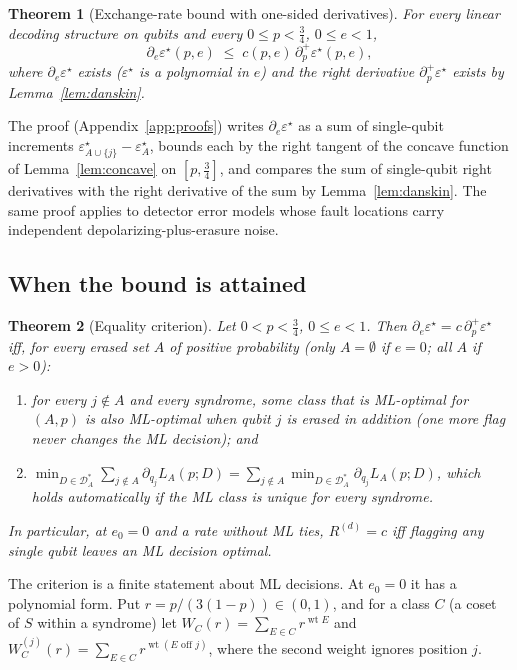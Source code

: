 \documentclass[11pt,a4paper]{article}
\theoremstyle{plain}
\newtheorem{theorem}{Theorem}[section]
\theoremstyle{definition}
\theoremstyle{remark}
\newcommand{\err}{\varepsilon^{\star}}
\newcommand{\wt}{\operatorname{wt}}
\begin{document}
\begin{theorem}[Exchange-rate bound with one-sided derivatives]\label{thm:rate-right}
For every linear decoding structure on qubits and every $0\le p<\tfrac34$, $0\le e<1$,
\[
\partial_e\err(p,e)\;\le\;c(p,e)\,\partial_p^+\err(p,e),
\]
where $\partial_e\err$ exists ($\err$ is a polynomial in $e$) and the right derivative $\partial_p^+\err$ exists by Lemma~\ref{lem:danskin}.
\end{theorem}

\noindent The proof (Appendix~\ref{app:proofs}) writes $\partial_e\err$ as a sum of single-qubit increments $\err_{A\cup\{j\}}-\err_A$, bounds each by the right tangent of the concave function of Lemma~\ref{lem:concave} on $[p,\tfrac34]$, and compares the sum of single-qubit right derivatives with the right derivative of the sum by Lemma~\ref{lem:danskin}. The same proof applies to detector error models whose fault locations carry independent depolarizing-plus-erasure noise.

\subsection{When the bound is attained}\label{sec:equality}

\begin{theorem}[Equality criterion]\label{thm:equality}
Let $0<p<\tfrac34$, $0\le e<1$. Then $\partial_e\err=c\,\partial_p^+\err$ iff, for every erased set $A$ of positive probability (only $A=\emptyset$ if $e=0$; all $A$ if $e>0$):
\begin{enumerate}[label=(E\arabic*)]
\item for every $j\notin A$ and every syndrome, some class that is ML-optimal for $(A,p)$ is also ML-optimal when qubit $j$ is erased in addition (\emph{one more flag never changes the ML decision}); and
\item $\min_{D\in\mathcal D^\ast_A}\sum_{j\notin A}\partial_{q_j}L_A(p;D)=\sum_{j\notin A}\min_{D\in\mathcal D^\ast_A}\partial_{q_j}L_A(p;D)$, which holds automatically if the ML class is unique for every syndrome.
\end{enumerate}
In particular, at $e_0=0$ and a rate without ML ties, $R^{(d)}=c$ iff flagging any single qubit leaves an ML decision optimal.
\end{theorem}

\noindent The criterion is a finite statement about ML decisions. At $e_0=0$ it has a polynomial form. Put $r=p/(3(1-p))\in(0,1)$, and for a class $C$ (a coset of $S$ within a syndrome) let $W_C(r)=\sum_{E\in C}r^{\wt E}$ and $W^{(j)}_C(r)=\sum_{E\in C}r^{\wt(E\text{ off }j)}$, where the second weight ignores position $j$.
\end{document}
